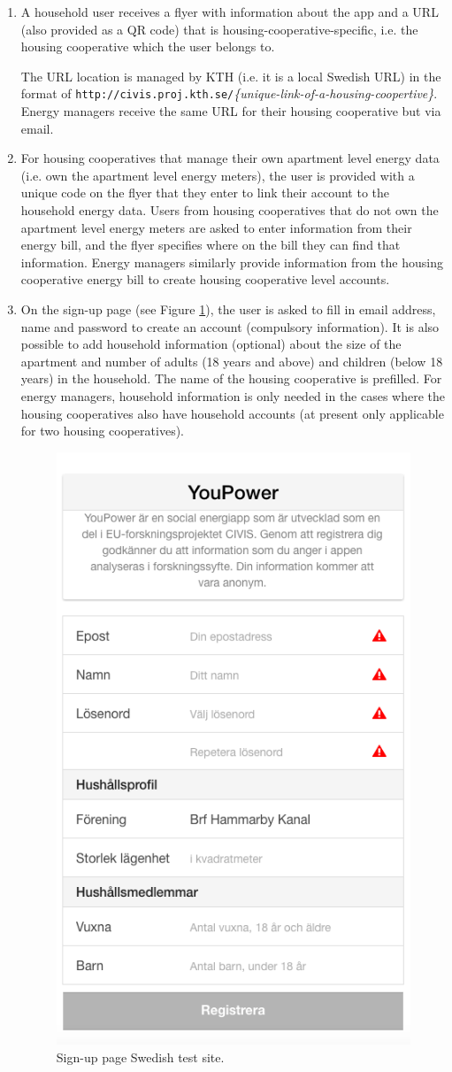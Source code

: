 \begin{enumerate}
\item A household user receives a flyer with information about the app and a URL (also provided as a QR code) that is housing-cooperative-specific, i.e. the housing cooperative which the user belongs to. 

The URL location is managed by KTH (i.e. it is a local Swedish URL) in the format of  \texttt{\small http://civis.proj.kth.se/}\textit{\{unique-link-of-a-housing-coopertive\}}. Energy managers receive the same URL for their housing cooperative but via email. 

\item For housing cooperatives that manage their own apartment level energy data (i.e. own the apartment level energy meters), the user is provided with a unique code on the flyer that they enter to link their account to the household energy data. Users from housing cooperatives that do not own the apartment level energy meters are asked to enter information from their energy bill, and the flyer specifies where on the bill they can find that information. Energy managers similarly provide information from the housing cooperative energy bill to create housing cooperative level accounts.

\item On the sign-up page (see Figure \ref{fig:signup_s}), the user is asked to fill in email address, name and password to create an account (compulsory information). It is also possible to add household information (optional) about the size of the apartment and number of adults (18 years and above) and children (below 18 years) in the household. The name of the housing cooperative is prefilled. For energy managers, household information is only needed in the cases where the housing cooperatives also have household accounts (at present only applicable for two housing cooperatives).

\begin{figure}[h!]
	\centering
	\includegraphics[width=0.45\linewidth]{img/signup_s.png}
	\caption{Sign-up page Swedish test site.}
	\label{fig:signup_s}
\end{figure}


\end{enumerate}
